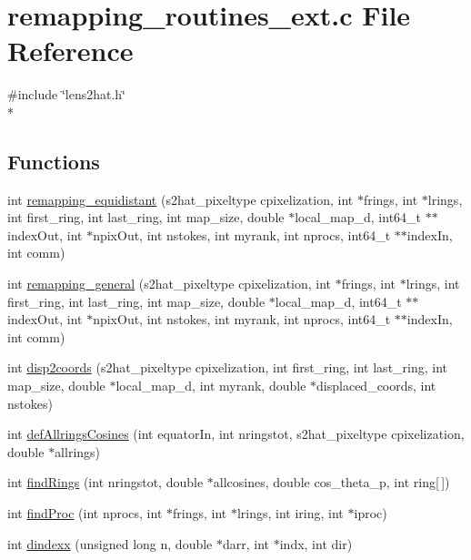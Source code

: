 \section{remapping\-\_\-routines\-\_\-ext.\-c File Reference}
\label{remapping__routines__ext_8c}
{\ttfamily \#include \char`\"{}lens2hat.\-h\char`\"{}}\\*
\subsection*{Functions}
\begin{DoxyCompactItemize}
\item 
int \hyperlink{remapping__routines__ext_8c_ab0d827687fd1c9f3cf4cba96729254e6}{remapping\-\_\-equidistant} (s2hat\-\_\-pixeltype cpixelization, int $\ast$frings, int $\ast$lrings, int first\-\_\-ring, int last\-\_\-ring, int map\-\_\-size, double $\ast$local\-\_\-map\-\_\-d, int64\-\_\-t $\ast$$\ast$index\-Out, int $\ast$npix\-Out, int nstokes, int myrank, int nprocs, int64\-\_\-t $\ast$$\ast$index\-In, int comm)
\item 
int \hyperlink{remapping__routines__ext_8c_aa63b9ecca2689c149a5dbcb2b4dcdd88}{remapping\-\_\-general} (s2hat\-\_\-pixeltype cpixelization, int $\ast$frings, int $\ast$lrings, int first\-\_\-ring, int last\-\_\-ring, int map\-\_\-size, double $\ast$local\-\_\-map\-\_\-d, int64\-\_\-t $\ast$$\ast$index\-Out, int $\ast$npix\-Out, int nstokes, int myrank, int nprocs, int64\-\_\-t $\ast$$\ast$index\-In, int comm)
\item 
int \hyperlink{remapping__routines__ext_8c_a8224d455c626532938c1729f5e62daee}{disp2coords} (s2hat\-\_\-pixeltype cpixelization, int first\-\_\-ring, int last\-\_\-ring, int map\-\_\-size, double $\ast$local\-\_\-map\-\_\-d, int myrank, double $\ast$displaced\-\_\-coords, int nstokes)
\item 
int \hyperlink{remapping__routines__ext_8c_af6cfda4741a11339b5a1d9c599411b87}{def\-Allrings\-Cosines} (int equator\-In, int nringstot, s2hat\-\_\-pixeltype cpixelization, double $\ast$allrings)
\item 
int \hyperlink{remapping__routines__ext_8c_a95c082e86d6e644f4789485021f90235}{find\-Rings} (int nringstot, double $\ast$allcosines, double cos\-\_\-theta\-\_\-p, int ring\mbox{[}$\,$\mbox{]})
\item 
int \hyperlink{remapping__routines__ext_8c_af4ba917a5b9f32394911c8d28d6c2d07}{find\-Proc} (int nprocs, int $\ast$frings, int $\ast$lrings, int iring, int $\ast$iproc)
\item 
int \hyperlink{remapping__routines__ext_8c_ad574f0dfca1f8db2b630a9b6cf3a45c9}{dindexx} (unsigned long n, double $\ast$darr, int $\ast$indx, int dir)
\end{DoxyCompactItemize}


